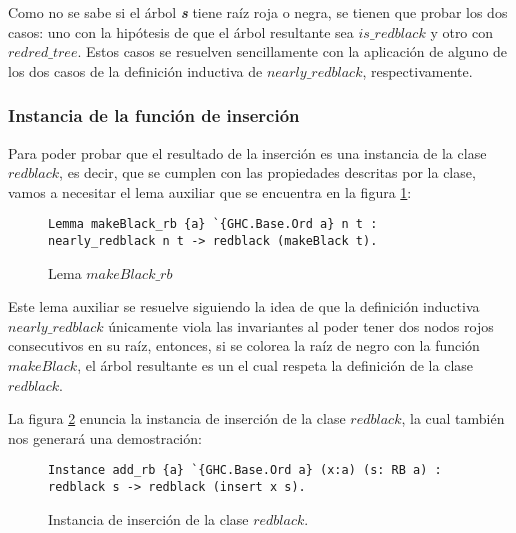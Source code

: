 Como no se sabe si el \'arbol \textit{\textbf{s}} tiene ra\'iz roja o negra, se tienen que probar 
los dos casos: uno con la hipótesis de que el \'arbol resultante sea 
\hyperref[inductive_isRedB]{$is\_redblack$} y otro con \hyperref[inductive_isRedB]{$redred\_tree$}. 
Estos casos se resuelven sencillamente con la aplicación de alguno de los dos casos de la 
definici\'on inductiva de \hyperref[inductive_isRedB]{$nearly\_redblack$}, respectivamente.

\subsubsection{Instancia de la funci\'on de inserci\'on}

Para poder probar que el resultado de la inserci\'on es una instancia de la clase 
\hyperref[class_rb]{$redblack$}, es decir, que se cumplen con las propiedades descritas por la 
clase, vamos a necesitar el lema auxiliar que se encuentra en la figura \ref{lema_3}:
\begin{figure}[!ht]
\centering
\captionsetup{justification=centering}
\begin{verbatim}
Lemma makeBlack_rb {a} `{GHC.Base.Ord a} n t :
nearly_redblack n t -> redblack (makeBlack t).
\end{verbatim}
\caption{Lema $makeBlack\_rb$}
\label{lema_3}
\end{figure}

Este lema auxiliar se resuelve siguiendo la idea de que la definici\'on inductiva 
\hyperref[inductive_isRedB]{$nearly\_redblack$} únicamente viola las invariantes al poder tener dos 
nodos rojos consecutivos en su raíz, entonces, si se colorea la raíz de negro con la función 
\hyperref[raiz_negra_func]{$makeBlack$}, el \'arbol resultante es un {\arn} el cual respeta la 
definición de la clase \hyperref[class_rb]{$redblack$}.

La figura \ref{instance_ins} enuncia la instancia de inserci\'on de la clase 
\hyperref[class_rb]{$redblack$}, la cual también nos generar\'a una demostraci\'on:

\begin{figure}[!ht]
\centering
\captionsetup{justification=centering}
\begin{verbatim}
Instance add_rb {a} `{GHC.Base.Ord a} (x:a) (s: RB a) :
redblack s -> redblack (insert x s).
\end{verbatim}
\caption{Instancia de inserci\'on de la clase \hyperref[class_rb]{$redblack$}.}
\label{instance_ins}
\end{figure}

